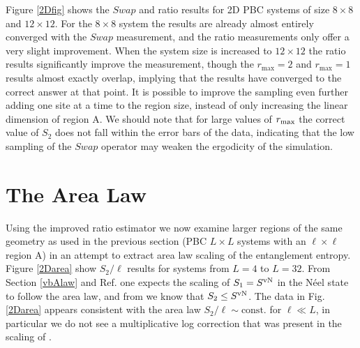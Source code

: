 Figure \ref{2Dfig} shows the $Swap$ and ratio results for 2D PBC systems of size $8 \times 8$ and $12 \times 12$.
For the $8\times 8$ system the results are already almost entirely converged with the $Swap$ measurement, and the ratio measurements only offer a very slight improvement.
	When the system size is increased to $12 \times 12$ the ratio results significantly improve the measurement, though the $r_{\max} = 2$ and $r_{\max} = 1$ results almost exactly overlap, implying that the results have converged to the correct answer at that point.
	It is possible to improve the sampling even further adding one site at a time to the region size, instead of only increasing the linear dimension of region A.
	We should note that for large values of $r_{\rm max}$ the correct value of $S_2$ does not fall within the error bars of the data, indicating that the low sampling of the $Swap$ operator may weaken the ergodicity of the simulation.

\section{The Area Law}

Using the improved ratio estimator we now examine larger regions of the same geometry as used in the previous section (PBC $L \times L$ systems with an $\ell \times\ell$ region A) in an attempt to extract area law scaling of the entanglement entropy.
Figure \ref{2Darea} show $S_2/\ell$ results for systems from $L=4$ to $L=32$.
From Section \ref{vbAlaw} and Ref. \cite{PRL1} one expects the scaling of $S_1 = S^{\text{vN}}$ in the N\'eel state to follow the area law, and from  we know that $S_2 \le S^{\text{vN}}$.
The data in Fig. \ref{2Darea} appears consistent with the area law $S_2/\ell \sim \text{const.}$ for $\ell \ll L$, in particular we do not see a multiplicative log correction that was present in the scaling of \vb \cite{Alet, Chh}. 

